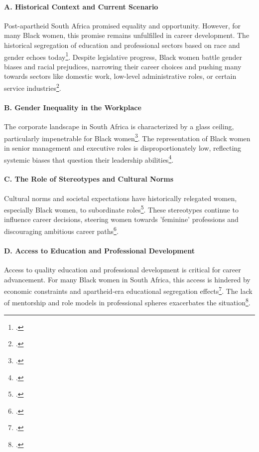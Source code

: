 \documentclass{article}
\begin{document}
\paragraph{A. Historical Context and Current Scenario}
Post-apartheid South Africa promised equality and opportunity. However, for many Black women, this promise remains unfulfilled in career development. The historical segregation of education and professional sectors based on race and gender echoes today\footcite{francis2022black}. Despite legislative progress, Black women battle gender biases and racial prejudices, narrowing their career choices and pushing many towards sectors like domestic work, low-level administrative roles, or certain service industries\footcite{tirivangasih2018fostering}.

\paragraph{B. Gender Inequality in the Workplace}
The corporate landscape in South Africa is characterized by a glass ceiling, particularly impenetrable for Black women\footcite{gradin2018occupational}. The representation of Black women in senior management and executive roles is disproportionately low, reflecting systemic biases that question their leadership abilities\footcite{dosunmu2022discourse}.

\paragraph{C. The Role of Stereotypes and Cultural Norms}
Cultural norms and societal expectations have historically relegated women, especially Black women, to subordinate roles\footcite{rensburg2021doing}. These stereotypes continue to influence career decisions, steering women towards 'feminine' professions and discouraging ambitious career paths\footcite{gradin2018occupational}.

\paragraph{D. Access to Education and Professional Development}
Access to quality education and professional development is critical for career advancement. For many Black women in South Africa, this access is hindered by economic constraints and apartheid-era educational segregation effects\footcite{wadley2000south}. The lack of mentorship and role models in professional spheres exacerbates the situation\footcite{khau2016comprehensive}.
\end{document}
